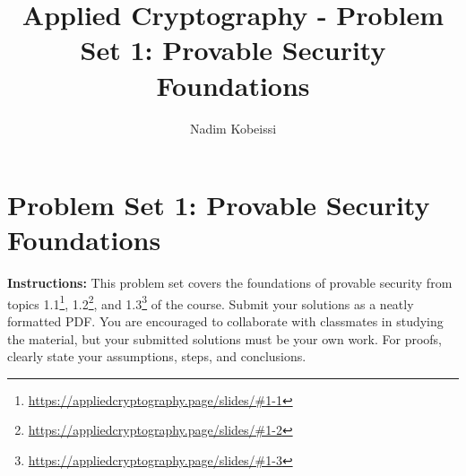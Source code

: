 \documentclass[10pt,a4paper,american]{exam}
\title{Applied Cryptography - Problem Set 1: Provable Security Foundations}
\author{Nadim Kobeissi}
\begin{document}
\classhandoutheader
\section*{Problem Set 1: Provable Security Foundations}

\begin{tcolorbox}[colframe=OliveGreen!30!white,colback=OliveGreen!5!white]
	\textbf{Instructions:} This problem set covers the foundations of provable security from topics 1.1\footnote{\url{https://appliedcryptography.page/slides/\#1-1}}, 1.2\footnote{\url{https://appliedcryptography.page/slides/\#1-2}}, and 1.3\footnote{\url{https://appliedcryptography.page/slides/\#1-3}} of the course. Submit your solutions as a neatly formatted PDF. You are encouraged to collaborate with classmates in studying the material, but your submitted solutions must be your own work. For proofs, clearly state your assumptions, steps, and conclusions.
\end{tcolorbox}
\end{document}
